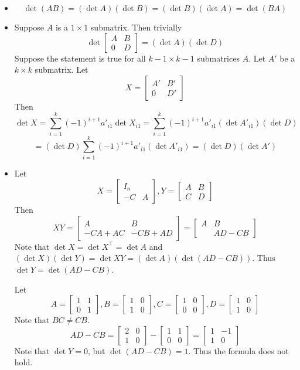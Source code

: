 \begin{itemize}
$$\begin{bmatrix}
0 & 1
\end{bmatrix}\right) = ad - bc$$
\item[(11)]
$$\det(AB) = (\det A)(\det B) = (\det B)(\det A) = \det(BA)$$
\item[(12)]
Suppose $A$ is a $1 \times 1$ submatrix. Then trivially
$$\det\begin{bmatrix}
A & B \\
0 & D
\end{bmatrix} = (\det A)(\det D)$$
Suppose the statement is true for all $k - 1 \times k - 1$ submatrices $A$. Let $A'$ be a $k \times k$ submatrix. Let 
$$X = \begin{bmatrix}
A' & B' \\
0 & D'
\end{bmatrix}$$
Then
$$\det X = \sum_{i=1}^k (-1)^{i+1}a'_{i1}\det X_{i1} = \sum_{i=1}^k (-1)^{i+1}a'_{i1}(\det A'_{i1})(\det D)$$
$$= (\det D)\sum_{i=1}^k (-1)^{i+1}a'_{i1}(\det A'_{i1}) = (\det D)(\det A')$$
\item[(13)]
Let
$$X = \begin{bmatrix}
I_n \\
-C & A
\end{bmatrix}, Y = \begin{bmatrix}
A & B \\
C & D
\end{bmatrix}$$
Then
$$XY = \begin{bmatrix}
A & B \\
-CA + AC & -CB + AD
\end{bmatrix} = \begin{bmatrix}
A & B \\
& AD - CB
\end{bmatrix}$$
Note that $\det X = \det X^\top = \det A$ and  $(\det X)(\det Y) = \det XY = (\det A)(\det (AD - CB))$. Thus $\det Y = \det(AD - CB)$.

Let
$$A = \begin{bmatrix}
1 & 1 \\
0 & 1
\end{bmatrix}, B = \begin{bmatrix}
1 & 0 \\
1 & 0
\end{bmatrix}, C = \begin{bmatrix}
1 & 0 \\
0 & 0
\end{bmatrix}, D = \begin{bmatrix}
1 & 0 \\
1 & 0
\end{bmatrix}$$
Note that $BC \neq CB$.
$$AD - CB = \begin{bmatrix}
2 & 0 \\
1 & 0
\end{bmatrix} - \begin{bmatrix}
1 & 1 \\
0 & 0
\end{bmatrix} = \begin{bmatrix}
1 & -1 \\
1 & 0
\end{bmatrix}$$
Note that $\det Y = 0$, but $\det (AD - CB) = 1$. Thus the formula does not hold.
\end{itemize}
